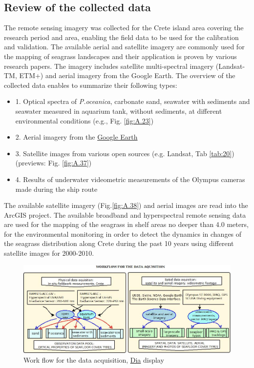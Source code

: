 \documentclass[10pt, a4paper]{article}
\begin{document}
\subsection{Review of the collected data}
The remote sensing imagery was collected for the Crete island area covering the research period and
area, enabling the field data to be used for the calibration and validation. The available aerial and
satellite imagery are commonly used for the mapping of seagrass landscapes and their application is
proven by various research papers. The imagery includes satellite multi-spectral imagery (Landsat-TM,
ETM+) and aerial imagery from the Google Earth.
The overview of the collected data enables to summarize their following types:
\begin{itemize}
	\item[] 1. Optical spectra of \textit{P.oceanica}, carbonate sand, seawater with sediments and seawater measured in aquarium tank, without sediments, at different environmental conditions (e.g., Fig. \ref{fig:A.23})
	\item[]2. Aerial imagery from the \href{http://www.google.com/earth/index.html}{Google Earth}
	\item[]3. Satellite images from various open sources (e.g. Landsat, Tab \ref{tab:20}) (previews: Fig. \ref{fig:A.37})
	\item[]4. Results of underwater videometric measurements of the Olympus cameras made during the ship route
\end{itemize}
The available satellite imagery (Fig.\ref{fig:A.38}) and aerial images are read into the ArcGIS project.
The available broadband and hyperspectral remote sensing data are used for the mapping of the
seagrass in shelf areas no deeper than 4.0 meters, for the environmental monitoring in order to detect
the dynamics in changes of the seagrass distribution along Crete during the past 10 years using
different satellite images for 2000-2010.

\begin{figure}[h]
	\centering
	\includegraphics[scale=0.40]{UML_Dia.jpg}
	\caption{Work flow for the data acquisition, \href{http://live.gnome.org/Dia}{Dia} display}
	\label{fig:24}
\end{figure}
\end{document}
